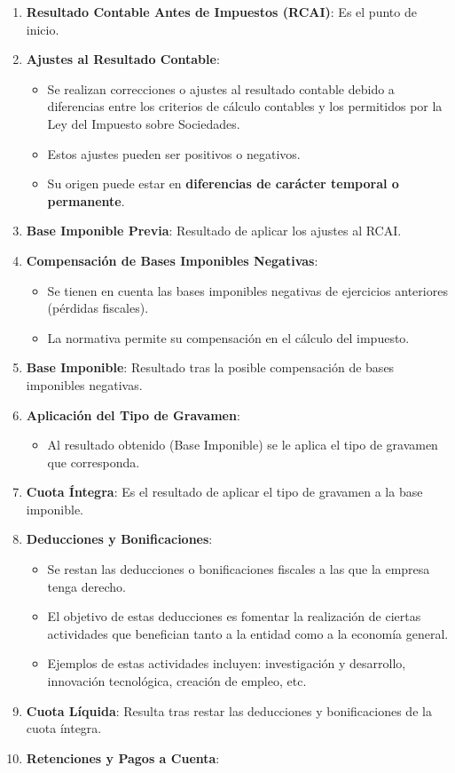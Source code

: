 \documentclass[
  paper=a4,
  ,captions=tableheading
]{scrbook}
\providecommand{\tightlist}{%
  \setlength{\itemsep}{0pt}\setlength{\parskip}{0pt}}
\begin{document}
\begin{enumerate}
\def\labelenumi{\arabic{enumi}.}
\tightlist
\item
  \textbf{Resultado Contable Antes de Impuestos (RCAI)}: Es el punto de
  inicio.
\item
  \textbf{Ajustes al Resultado Contable}:

  \begin{itemize}
  \tightlist
  \item
    Se realizan correcciones o ajustes al resultado contable debido a
    diferencias entre los criterios de cálculo contables y los
    permitidos por la Ley del Impuesto sobre Sociedades.
  \item
    Estos ajustes pueden ser positivos o negativos.
  \item
    Su origen puede estar en \textbf{diferencias de carácter temporal o
    permanente}.
  \end{itemize}
\item
  \textbf{Base Imponible Previa}: Resultado de aplicar los ajustes al
  RCAI.
\item
  \textbf{Compensación de Bases Imponibles Negativas}:

  \begin{itemize}
  \tightlist
  \item
    Se tienen en cuenta las bases imponibles negativas de ejercicios
    anteriores (pérdidas fiscales).
  \item
    La normativa permite su compensación en el cálculo del impuesto.
  \end{itemize}
\item
  \textbf{Base Imponible}: Resultado tras la posible compensación de
  bases imponibles negativas.
\item
  \textbf{Aplicación del Tipo de Gravamen}:

  \begin{itemize}
  \tightlist
  \item
    Al resultado obtenido (Base Imponible) se le aplica el tipo de
    gravamen que corresponda.
  \end{itemize}
\item
  \textbf{Cuota Íntegra}: Es el resultado de aplicar el tipo de gravamen
  a la base imponible.
\item
  \textbf{Deducciones y Bonificaciones}:

  \begin{itemize}
  \tightlist
  \item
    Se restan las deducciones o bonificaciones fiscales a las que la
    empresa tenga derecho.
  \item
    El objetivo de estas deducciones es fomentar la realización de
    ciertas actividades que benefician tanto a la entidad como a la
    economía general.
  \item
    Ejemplos de estas actividades incluyen: investigación y desarrollo,
    innovación tecnológica, creación de empleo, etc.
  \end{itemize}
\item
  \textbf{Cuota Líquida}: Resulta tras restar las deducciones y
  bonificaciones de la cuota íntegra.
\item
  \textbf{Retenciones y Pagos a Cuenta}:


\end{enumerate}
\end{document}
